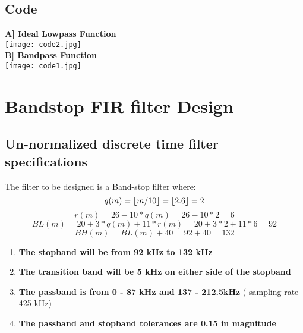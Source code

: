 \documentclass[12pt]{article}
\DeclarePairedDelimiter\floor{\lfloor}{\rfloor}
\begin{document}
\subsection{Code}
\textbf{A] Ideal Lowpass Function}
\\\texttt{[image: code2.jpg]}
\newpage
\\\textbf{B] Bandpass Function}
    \\\texttt{[image: code1.jpg]}

\section{Bandstop FIR filter Design}
\subsection{Un-normalized discrete time filter specifications}

  
    The filter to be designed is a Band-stop filter where:
    \begin{equation}
        q(m) = \floor{m/10} = \floor{2.6} = 2
    \end{equation}
    \begin{equation}
        r(m) = 26 - 10*q(m) = 26 - 10*2 = 6
    \end{equation}
    \begin{equation}
        BL(m) = 20 + 3*q(m) + 11*r(m) = 20 + 3*2 + 11*6 = 92
    \end{equation}
    \begin{equation}
        BH(m) = BL(m) + 40 = 92 + 40 = 132
    \end{equation}
  

    \begin{enumerate}
    \item \textbf{The stopband will be from 92 kHz to 132 kHz}
    \item \textbf{The transition band will be 5 kHz on either side of the stopband}
    \item \textbf{The passband is from 0 - 87 kHz and 137 - 212.5kHz} ( sampling rate 425 kHz)
    \item \textbf{The passband and stopband tolerances are 0.15 in magnitude}

\end{enumerate}
\end{document}
